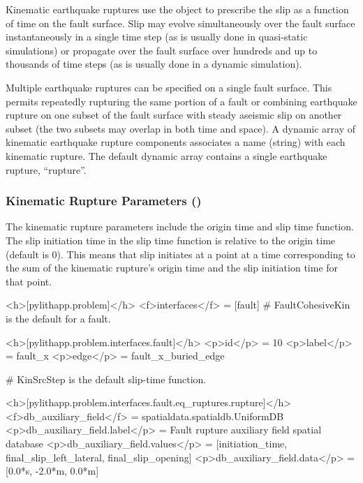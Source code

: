 Kinematic earthquake ruptures use the  object
to prescribe the slip as a function of time on the fault surface. Slip
may evolve simultaneously over the fault surface instantaneously in a
single time step (as is usually done in quasi-static simulations) or
propagate over the fault surface over hundreds and up to thousands of
time steps (as is usually done in a dynamic simulation).

Multiple earthquake ruptures can be specified on a single fault surface.
This permits repeatedly rupturing the same portion of a fault or combining
earthquake rupture on one subset of the fault surface with steady
aseismic slip on another subset (the two subsets may overlap in both
time and space). A dynamic array of kinematic earthquake rupture components
associates a name (string) with each kinematic rupture. The default
dynamic array contains a single earthquake rupture, ``rupture''. 


\subsubsection{Kinematic Rupture Parameters (\protect{})}

The kinematic rupture parameters include the origin time and slip
time function. The slip initiation time in the slip time function
is relative to the origin time (default is 0). This means that slip
initiates at a point at a time corresponding to the sum of the kinematic
rupture's origin time and the slip initiation time for that point.

\begin{cfg}
<h>[pylithapp.problem]</h>
<f>interfaces</f> = [fault]
# FaultCohesiveKin is the default for a fault.

<h>[pylithapp.problem.interfaces.fault]</h>
<p>id</p> = 10
<p>label</p> = fault_x
<p>edge</p> = fault_x_buried_edge

# KinSrcStep is the default slip-time function.

<h>[pylithapp.problem.interfaces.fault.eq_ruptures.rupture]</h>
<f>db_auxiliary_field</f> = spatialdata.spatialdb.UniformDB
<p>db_auxiliary_field.label</p> = Fault rupture auxiliary field spatial database
<p>db_auxiliary_field.values</p> = [initiation_time, final_slip_left_lateral, final_slip_opening]
<p>db_auxiliary_field.data</p> = [0.0*s, -2.0*m, 0.0*m]
\end{cfg}

